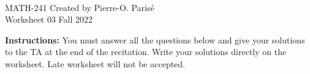 \documentclass[addpoints, 12pt]{exam}%
\theoremstyle{definition}
\begin{document}
	\noindent \hrulefill \\
	MATH-241 \hfill Created by Pierre-O. Paris{\'e}\\
	Worksheet 03 \hfill Fall 2022\\\vspace*{-0.7cm}
	
	\noindent\hrulefill
	
\vspace*{0.5cm}

\noindent{}

\vspace*{0.25cm}
\begin{center}
\gradetable[h][questions]
\end{center}
\vspace*{0.25cm}

{\bf Instructions:} You must answer all the questions below and give your solutions to the TA at the end of the recitation. Write your solutions directly on the worksheet. Late worksheet will not be accepted.


\vspace*{0.5cm}
\end{document}
